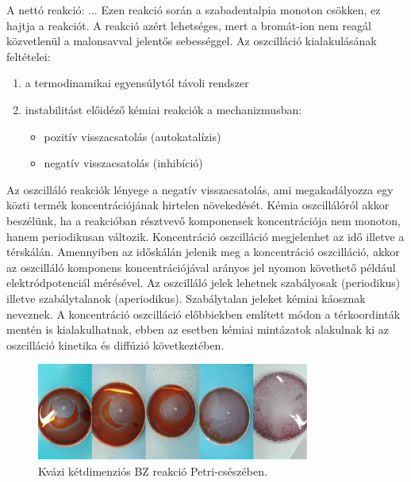 A nettó reakció: ... Ezen reakció során a szabadentalpia monoton csökken, ez hajtja a reakciót. A reakció azért lehetséges, mert a bromát-ion nem reagál közvetlenül a malonsavval jelentős sebességgel. Az oszcilláció kialakulásának feltételei:
\begin{enumerate}
\item a termodinamikai egyensúlytól távoli rendszer
\item instabilitást előidéző kémiai reakciók a mechanizmusban:
 \begin{itemize}
\item pozitív visszacsatolás (autokatalízis)
\item negatív visszacsatolás (inhibíció)
\end{itemize}
\end{enumerate}

Az oszcilláló reakciók lényege a negatív visszacsatolás, ami megakadályozza egy közti termék koncentrációjának hirtelen növekedését.
Kémia oszcillálóról akkor beszélünk, ha a reakcióban résztvevő komponensek koncentrációja nem monoton, hanem periodikusan változik. Koncentráció oszcilláció megjelenhet az idő illetve a térskálán. Amennyiben az időskálán jelenik meg a koncentráció oszcilláció, akkor az oszcilláló komponens koncentrációjával arányos jel nyomon követhető például elektródpotenciál mérésével.
Az oszcilláló jelek lehetnek szabályosak (periodikus) illetve szabálytalanok (aperiodikus). Szabálytalan jeleket kémiai káosznak neveznek. A koncentráció oszcilláció előbbiekben említett módon a térkoordinták mentén is kialakulhatnak, ebben az esetben kémiai mintázatok alakulnak ki az oszcilláció kinetika és diffúzió következtében.


\begin{figure}
\centering
\includegraphics[width=0.8\textwidth]{img/oscillating_reaction.jpg}
\caption{Kvázi kétdimenziós BZ reakció Petri-csészében.}
\label{fig:ionophores}
\end{figure}

